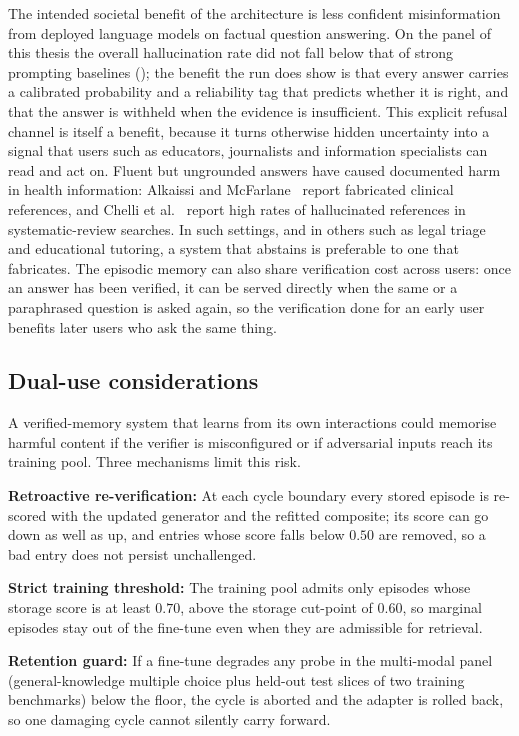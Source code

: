 The intended societal benefit of the architecture is less confident misinformation from deployed language models on factual question answering. On the panel of this thesis the overall hallucination rate did not fall below that of strong prompting baselines (); the benefit the run does show is that every answer carries a calibrated probability and a reliability tag that predicts whether it is right, and that the answer is withheld when the evidence is insufficient. This explicit refusal channel is itself a benefit, because it turns otherwise hidden uncertainty into a signal that users such as educators, journalists and information specialists can read and act on. Fluent but ungrounded answers have caused documented harm in health information: Alkaissi and McFarlane~\cite{alkaissi2023artificial} report fabricated clinical references, and Chelli et al.~\cite{info:doi/10.2196/53164} report high rates of hallucinated references in systematic-review searches. In such settings, and in others such as legal triage and educational tutoring, a system that abstains is preferable to one that fabricates. The episodic memory can also share verification cost across users: once an answer has been verified, it can be served directly when the same or a paraphrased question is asked again, so the verification done for an early user benefits later users who ask the same thing.

\subsection{Dual-use considerations}
\label{sec:soc-dual-use}

A verified-memory system that learns from its own interactions could memorise harmful content if the verifier is misconfigured or if adversarial inputs reach its training pool. Three mechanisms limit this risk.

\textbf{Retroactive re-verification:} At each cycle boundary every stored episode is re-scored with the updated generator and the refitted composite; its score can go down as well as up, and entries whose score falls below $0.50$ are removed, so a bad entry does not persist unchallenged.

\textbf{Strict training threshold:} The training pool admits only episodes whose storage score is at least $0.70$, above the storage cut-point of $0.60$, so marginal episodes stay out of the fine-tune even when they are admissible for retrieval.

\textbf{Retention guard:} If a fine-tune degrades any probe in the multi-modal panel (general-knowledge multiple choice plus held-out test slices of two training benchmarks) below the floor, the cycle is aborted and the adapter is rolled back, so one damaging cycle cannot silently carry forward.

